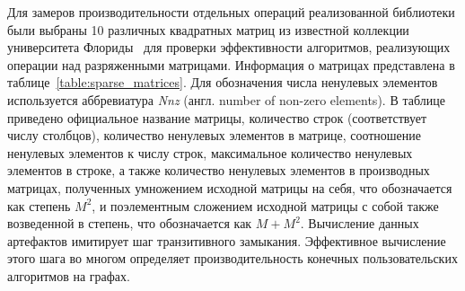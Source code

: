Для замеров производительности отдельных операций реализованной библиотеки были выбраны 10 различных квадратных матриц из известной коллекции университета Флориды~\cite{net:sp_matrix_data_florida} для проверки эффективности алгоритмов, реализующих операции над разряженными матрицами. 
Информация о матрицах представлена в таблице~\ref{table:sparse_matrices}. 
Для обозначения числа ненулевых элементов используется аббревиатура \textit{Nnz} (англ. number of non-zero elements). 
В таблице приведено официальное название матрицы, количество строк (соответствует числу столбцов), количество ненулевых элементов в матрице, соотношение ненулевых элементов к числу строк, максимальное количество ненулевых элементов в строке, а также количество ненулевых элементов в производных матрицах, полученных умножением исходной матрицы на себя, что обозначается как степень $M^2$, и поэлементным сложением исходной матрицы с собой также возведенной в степень, что обозначается как $M + M^2$.
Вычисление данных артефактов имитирует шаг транзитивного замыкания.
Эффективное вычисление этого шага во многом определяет производительность конечных пользовательских алгоритмов на графах.

\begin{table}[h]
\begin{center}
\caption{Разреженные матричные данные}
\label{table:sparse_matrices}
{}
\end{center}
\end{table}

